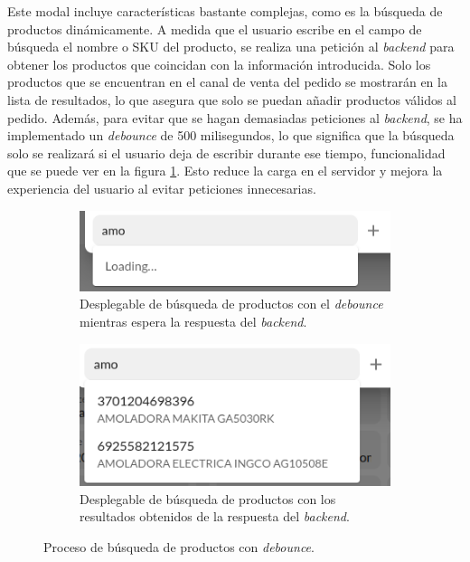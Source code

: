 Este modal incluye características bastante complejas, como es la búsqueda de productos dinámicamente. A medida que el usuario escribe en el campo de búsqueda el nombre o SKU del producto, se realiza una petición al \textit{backend} para obtener los productos que coincidan con la información introducida. Solo los productos que se encuentran en el canal de venta del pedido se mostrarán en la lista de resultados, lo que asegura que solo se puedan añadir productos válidos al pedido. Además, para evitar que se hagan demasiadas peticiones al \textit{backend}, se ha implementado un \textit{debounce} de 500 milisegundos, lo que significa que la búsqueda solo se realizará si el usuario deja de escribir durante ese tiempo, funcionalidad que se puede ver en la figura \ref{fig:dev:ss:busqueda_debounced}. Esto reduce la carga en el servidor y mejora la experiencia del usuario al evitar peticiones innecesarias.

\begin{figure}[H]
    \centering
    \begin{subfigure}{0.45\linewidth}
        \centering
        \includegraphics[width=\linewidth]{figures/design_develop/screenshots/busqueda_debounced_loading.png}
        \caption{Desplegable de búsqueda de productos con el \textit{debounce} mientras espera la respuesta del \textit{backend}.}
    \end{subfigure}
    \hfill
    \begin{subfigure}{0.45\linewidth}
        \centering
        \includegraphics[width=\linewidth]{figures/design_develop/screenshots/busqueda_debounced.png}
        \caption{Desplegable de búsqueda de productos con los resultados obtenidos de la respuesta del \textit{backend}.}
    \end{subfigure}
    \par\vspace{0.3cm}
    \caption{Proceso de búsqueda de productos con \textit{debounce}.}
    \label{fig:dev:ss:busqueda_debounced}
\end{figure}


